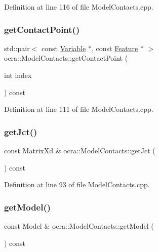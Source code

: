Definition at line 116 of file Model\+Contacts.\+cpp.

\hypertarget{classocra_1_1ModelContacts_a6fde5f06051fafaebd07a1ebb80bd82c}{}\label{classocra_1_1ModelContacts_a6fde5f06051fafaebd07a1ebb80bd82c} 
\subsubsection{\texorpdfstring{get\+Contact\+Point()}{getContactPoint()}}
{\footnotesize\ttfamily std\+::pair$<$ const \hyperlink{classocra_1_1Variable}{Variable} $\ast$, const \hyperlink{classocra_1_1Feature}{Feature} $\ast$ $>$ ocra\+::\+Model\+Contacts\+::get\+Contact\+Point (\begin{DoxyParamCaption}\item[{int}]{index }\end{DoxyParamCaption}) const}



Definition at line 111 of file Model\+Contacts.\+cpp.

\hypertarget{classocra_1_1ModelContacts_ac3c23337fdfac47ddf40b7e3332e31fc}{}\label{classocra_1_1ModelContacts_ac3c23337fdfac47ddf40b7e3332e31fc} 
\subsubsection{\texorpdfstring{get\+Jct()}{getJct()}}
{\footnotesize\ttfamily const Matrix\+Xd \& ocra\+::\+Model\+Contacts\+::get\+Jct (\begin{DoxyParamCaption}{ }\end{DoxyParamCaption}) const}



Definition at line 93 of file Model\+Contacts.\+cpp.

\hypertarget{classocra_1_1ModelContacts_a188e822de7692fba999836b1ffb7f376}{}\label{classocra_1_1ModelContacts_a188e822de7692fba999836b1ffb7f376} 
\subsubsection{\texorpdfstring{get\+Model()}{getModel()}}
{\footnotesize\ttfamily const Model \& ocra\+::\+Model\+Contacts\+::get\+Model (\begin{DoxyParamCaption}{ }\end{DoxyParamCaption}) const}



